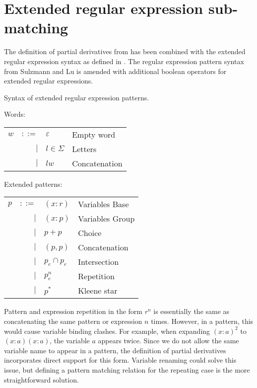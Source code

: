 \section{Extended regular expression sub-matching}
\label{ere-submatch}

The definition of partial derivatives from \cite{pdpat} has been combined with
the extended regular expression syntax as defined in \cite{pdere}. The regular
expression pattern syntax from Sulzmann and Lu is amended with additional
boolean operators for extended regular expressions.

\begin{defn}
   \label{defn-syn}
   Syntax of extended regular expression patterns.

   Words:

   \begin{tabular}{lrll}
      $w$	& $::=$	& $\varepsilon$		& Empty word	\\
		& $|$	& $l \in \Sigma$	& Letters	\\
		& $|$	& $lw$			& Concatenation	\\
   \end{tabular}

   Extended patterns:

   \begin{tabular}{lrll}
      $p$	& $::=$	& $(x:r)$			& Variables Base	\\
		& $|$	& $(x:p)$			& Variables Group	\\
		& $|$	& $p+p$				& Choice		\\
		& $|$	& $(p,p)$			& Concatenation		\\
		& $|$	& $p_e \cap p_e$		& Intersection		\\
        	& $|$	& $p_e^n$			& Repetition		\\
		& $|$	& $p^*$				& Kleene star		\\
   \end{tabular}
\end{defn}


Pattern and expression repetition in the form $r^n$ is essentially the same as
concatenating the same pattern or expression $n$ times. However, in a pattern,
this would cause variable binding clashes. For example, when expanding
$(x:a)^2$ to $(x:a)(x:a)$, the variable $a$ appears twice. Since we do not
allow the same variable name to appear in a pattern, the definition of partial
derivatives incorporates direct support for this form. Variable renaming could
solve this issue, but defining a pattern matching relation for the repeating
case is the more straightforward solution.

